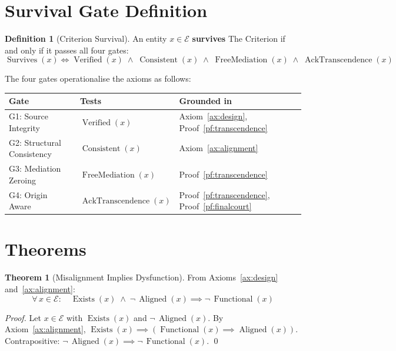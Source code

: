 \documentclass[11pt,a4paper]{article}
\theoremstyle{definition}
\newtheorem{definition}[axiom]{Definition}
\newtheorem{theorem}[axiom]{Theorem}
\newcommand{\E}{\mathcal{E}}      %
\newcommand{\Exists}{\operatorname{Exists}}
\newcommand{\Aligned}{\operatorname{Aligned}}
\newcommand{\Functional}{\operatorname{Functional}}
\newcommand{\Verified}{\operatorname{Verified}}
\newcommand{\Consistent}{\operatorname{Consistent}}
\newcommand{\FreeMediation}{\operatorname{FreeMediation}}
\newcommand{\AckTranscendence}{\operatorname{AckTranscendence}}
\newcommand{\Survives}{\operatorname{Survives}}
\begin{document}
\section{Survival Gate Definition}

\begin{definition}[Criterion Survival]
\label{def:survives}
An entity $x \in \E$ \textbf{survives} The Criterion if and only if it
passes all four gates:
\begin{equation}
\Survives(x) \iff
\Verified(x) \;\land\; \Consistent(x) \;\land\; \FreeMediation(x) \;\land\; \AckTranscendence(x)
\end{equation}
\end{definition}

\noindent The four gates operationalise the axioms as follows:

\begin{center}
\begin{tabular}{@{} l l l @{}}
\toprule
\textbf{Gate} & \textbf{Tests} & \textbf{Grounded in} \\
\midrule
G1: Source Integrity       & $\Verified(x)$         & Axiom~\ref{ax:design}, Proof~\ref{pf:transcendence} \\
G2: Structural Consistency & $\Consistent(x)$       & Axiom~\ref{ax:alignment} \\
G3: Mediation Zeroing      & $\FreeMediation(x)$    & Proof~\ref{pf:transcendence} \\
G4: Origin Aware           & $\AckTranscendence(x)$ & Proof~\ref{pf:transcendence}, Proof~\ref{pf:finalcourt} \\
\bottomrule
\end{tabular}
\end{center}

\section{Theorems}

\begin{theorem}[Misalignment Implies Dysfunction]
\label{thm:dysfunction}
From Axioms~\ref{ax:design} and~\ref{ax:alignment}:
\begin{equation}
\forall\, x \in \E : \quad \Exists(x) \;\land\; \lnot\,\Aligned(x) \implies \lnot\,\Functional(x)
\end{equation}
\begin{proof}
Let $x \in \E$ with $\Exists(x)$ and $\lnot\,\Aligned(x)$.
By Axiom~\ref{ax:alignment}, $\Exists(x) \implies (\Functional(x) \implies \Aligned(x))$.
Contrapositive: $\lnot\,\Aligned(x) \implies \lnot\,\Functional(x)$. \qed
\end{proof}
\end{theorem}
\end{document}
